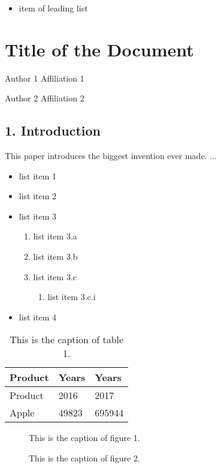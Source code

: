\begin{itemize}
\item item of leading list
\end{itemize}

\section*{Title of the Document}

Author 1
Affiliation 1

Author 2
Affiliation 2

\subsection{1. Introduction}

This paper introduces the biggest invention ever made. ...

\begin{itemize}
\item list item 1
\item list item 2
\item list item 3
  \begin{enumerate}
\item list item 3.a
\item list item 3.b
\item list item 3.c
    \begin{enumerate}
\item list item 3.c.i
    \end{enumerate}
  \end{enumerate}
\item list item 4
\end{itemize}

\begin{table}[h]
\caption{This is the caption of table 1.}
\begin{tabular}{|l|l|l|}
\hline
Product & Years & Years \\ \hline
Product & 2016 & 2017 \\ \hline
Apple & 49823 & 695944 \\ \hline
\end{tabular}
\end{table}

\begin{figure}[h]
\caption{This is the caption of figure 1.}
\end{figure}

\begin{figure}[h]
\caption{This is the caption of figure 2.}
\end{figure}

